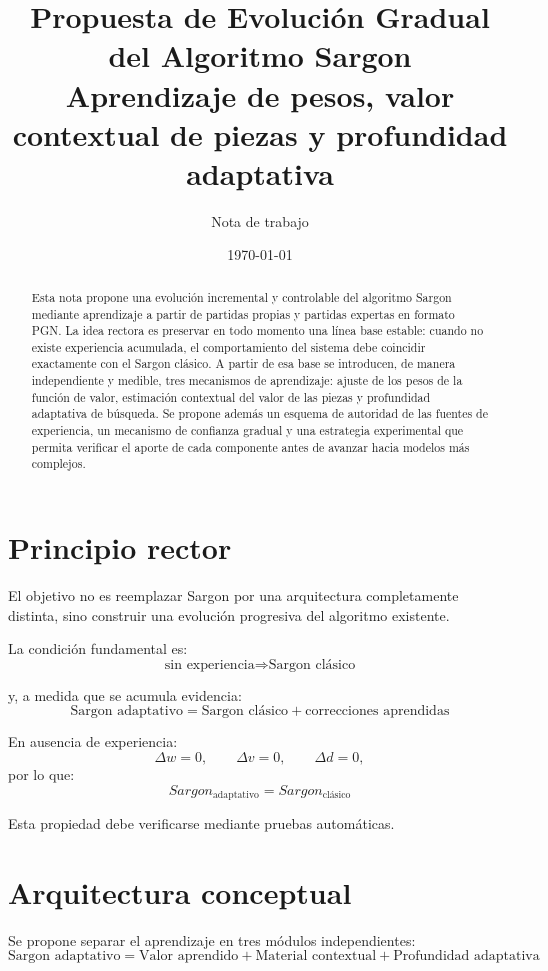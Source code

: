 \documentclass[11pt,a4paper]{article}
\title{\textbf{Propuesta de Evolución Gradual del Algoritmo Sargon}\\
Aprendizaje de pesos, valor contextual de piezas y profundidad adaptativa}
\author{Nota de trabajo}
\date{\today}
\begin{document}
\maketitle

\begin{abstract}
Esta nota propone una evolución incremental y controlable del algoritmo Sargon mediante aprendizaje a partir de partidas propias y partidas expertas en formato PGN. La idea rectora es preservar en todo momento una línea base estable: cuando no existe experiencia acumulada, el comportamiento del sistema debe coincidir exactamente con el Sargon clásico. A partir de esa base se introducen, de manera independiente y medible, tres mecanismos de aprendizaje: ajuste de los pesos de la función de valor, estimación contextual del valor de las piezas y profundidad adaptativa de búsqueda. Se propone además un esquema de autoridad de las fuentes de experiencia, un mecanismo de confianza gradual y una estrategia experimental que permita verificar el aporte de cada componente antes de avanzar hacia modelos más complejos.
\end{abstract}

\section{Principio rector}
El objetivo no es reemplazar Sargon por una arquitectura completamente distinta, sino construir una evolución progresiva del algoritmo existente.

La condición fundamental es:
\[
\boxed{\text{sin experiencia} \Rightarrow \text{Sargon clásico}}
\]

y, a medida que se acumula evidencia:
\[
\boxed{
\text{Sargon adaptativo}
=
\text{Sargon clásico}
+
\text{correcciones aprendidas}
}
\]

En ausencia de experiencia:
\[
\Delta w = 0,\qquad
\Delta v = 0,\qquad
\Delta d = 0,
\]
por lo que:
\[
\boxed{
Sargon_{\text{adaptativo}}
=
Sargon_{\text{clásico}}
}
\]

Esta propiedad debe verificarse mediante pruebas automáticas.

\section{Arquitectura conceptual}
Se propone separar el aprendizaje en tres módulos independientes:
\[
\boxed{
\text{Sargon adaptativo}
=
\text{Valor aprendido}
+
\text{Material contextual}
+
\text{Profundidad adaptativa}
}
\]
\end{document}
